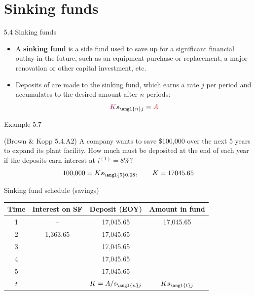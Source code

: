 \documentclass{beamer}
\begin{document}
\section{Sinking funds}

\begin{frame}{5.4 Sinking funds}

\begin{itemize}
\item A \textbf{sinking fund} is a side fund used to save up for a significant financial outlay in the future, such as an equipment purchase or replacement, a major renovation or other capital investment, etc.
\medskip
\item Deposits of  are made to the sinking fund, which earns a rate $j$ per period and accumulates to the desired amount  after $n$ periods:
\[
\purple{K} s_{\angl{n}j} = \red{A}
\]
\end{itemize}

\end{frame}

\begin{frame}{Example 5.7}

(Brown \& Kopp 5.4.A2) A company wants to save \$100,000 over the next 5 years to expand its plant facility. How much must be deposited at the end of each year if the deposits earn interest at $i^{(1)} = 8\%$?
\[
100{,}000 = K s_{\angl{5}0.08}, \qquad K = 17045.65
\]

\vfill
\end{frame}

\begin{frame}{Sinking fund schedule (savings)}

\begin{center}
\renewcommand{\arraystretch}{1.5}
\begin{tabular}{cccc}
\toprule
Time & Interest on SF & Deposit (EOY) & Amount in fund \\
\midrule
1 & -- & 17,045.65 & 17,045.65 \\
2 & 1,363.65 & 17,045.65 & \\
3 & & 17,045.65 & \\
4 & & 17,045.65 & \\
5 & & 17,045.65 & \\
\midrule
$t$ & & $K = A/s_{\angl{n}j}$ & $K s_{\angl{t}j}$ \\
\bottomrule
\end{tabular}
\end{center}

\end{frame}
\end{document}
